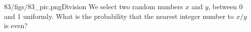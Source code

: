 \begin{problem}{83/figs/83_pic.png}{Division} We select two random numbers $x$ and $y$, between 0 and 1 uniformly. What is the probability that the nearest integer number to $x/y$ is even?
\end{problem}
